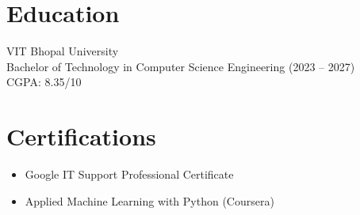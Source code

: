 \documentclass[10pt]{article}
\begin{document}
\section*{Education}

VIT Bhopal University\\
Bachelor of Technology in Computer Science Engineering (2023 – 2027)\\
CGPA: 8.35/10\\


\section*{Certifications}

\begin{itemize}[leftmargin=*]
\item Google IT Support Professional Certificate
\item Applied Machine Learning with Python (Coursera)
\end{itemize}
\end{document}
